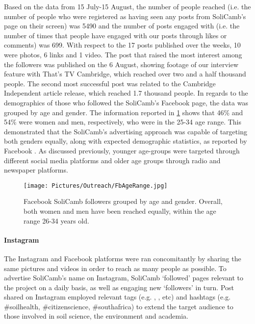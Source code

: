 Based on the data from 15 July-15 August, the number of people reached (i.e. the number of people who were registered as having seen any posts from SoliCamb's page on their screen) was 5490 and the number of posts engaged with (i.e. the number of times that people have engaged with our posts through likes or comments) was 699. With respect to the 17 posts published over the weeks, 10 were photos, 6 links and 1 video. The post that raised the most interest among the followers was published on the 6 August, showing footage of our interview feature with That's TV Cambridge, which reached over two and a half thousand people. The second most successful post was related to the Cambridge Independent article release, which reached 1.7 thousand people. In regards to the demographics of those who followed the SoliCamb's Facebook page, the data was grouped by age and gender. The information reported in \cref{fig:FbAge} shows that 46\% and 54\% were women and men, respectively, who were in the 25-34 age range. This demonstrated that the SoliCamb's advertising approach was capable of targeting both genders equally, along with expected demographic statistics, as reported by Facebook \cite{investopedia}. As discussed previously, younger age-groups were targeted through different social media platforms and older age groups through radio and newspaper platforms.

 \begin{figure}[h!]
    	\centering
    	\texttt{[image: Pictures/Outreach/FbAgeRange.jpg]}
    	\captionsetup{justification = centering}
    	\caption{Facebook SoliCamb followers grouped by age and gender. Overall, both women and men have been reached equally, within the age range 26-34 years old.}
    	\label{fig:FbAge}
     \end{figure}

 
\paragraph{Instagram}
 
The Instagram and Facebook platforms were ran concomitantly by sharing the same pictures and videos in order to reach as many people as possible. To advertise SoliCamb's name on Instagram, SoliCamb  `followed' pages relevant to the project on a daily basis, as well as engaging new `followers' in turn. Post shared on Instagram employed relevant tags (e.g. \@solicamb, \@EPSRC, etc) and hashtags (e.g. \#soilhealth, \#citizenscience, \#southafrica) to extend the target audience to those involved in soil science, the environment and academia.

